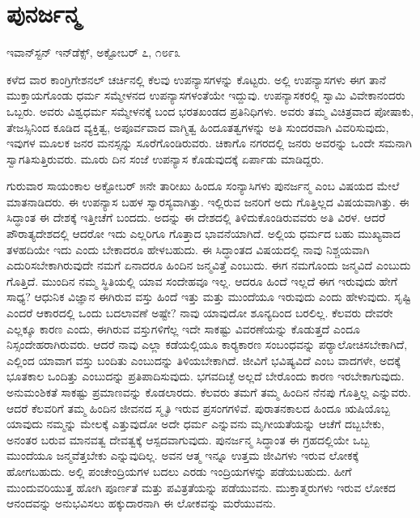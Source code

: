 \section*{ಪುನರ್ಜನ್ಮ }

\begin{flushright}
ಇವಾನ್‍ಸ್ಟನ್ ಇನ್‍ಡೆಕ್ಸ್, ಅಕ್ಟೋಬರ್ ೭, ೧೮೯೩
\end{flushright}

ಕಳೆದ ವಾರ ಕಾಂಗ್ರಿಗೇಶನಲ್ ಚರ್ಚಿನಲ್ಲಿ ಕೆಲವು ಉಪನ್ಯಾಸಗಳನ್ನು ಕೊಟ್ಟರು. ಅಲ್ಲಿ ಉಪನ್ಯಾಸಗಳು ಈಗ ತಾನೆ ಮುಕ್ತಾಯಗೊಂಡು ಧರ್ಮ ಸಮ್ಮೇಳನದ ಉಪನ್ಯಾಸಗಳಂತೆಯೇ ಇದ್ದುವು. ಉಪನ್ಯಾಸಕರಲ್ಲಿ ಸ್ವಾಮಿ ವಿವೇಕಾನಂದರು ಒಬ್ಬರು. ಅವರು ವಿಶ್ವಧರ್ಮ ಸಮ್ಮೇಳನಕ್ಕೆ ಬಂದ ಭರತಖಂಡದ ಪ್ರತಿನಿಧಿಗಳು. ಅವರು ತಮ್ಮ ವಿಚಿತ್ರವಾದ ಪೋಷಾಕು, ತೇಜಸ್ಸಿನಿಂದ ಕೂಡಿದ ವ್ಯಕ್ತಿತ್ವ, ಅಪೂರ್ವವಾದ ವಾಗ್ಮಿತ್ವ ಹಿಂದೂತತ್ವಗಳನ್ನು ಅತಿ ಸುಂದರವಾಗಿ ವಿವರಿಸುವುದು, ಇವುಗಳ ಮೂಲಕ ಜನರ ಮನಸ್ಸನ್ನು ಸೂರೆಗೊಂಡಿರುವರು. ಚಿಕಾಗೊ ನಗರದಲ್ಲಿ ಜನರು ಅವರನ್ನು ಒಂದೇ ಸಮನಾಗಿ ಸ್ವಾಗತಿಸುತ್ತಿರುವರು. ಮೂರು ದಿನ ಸಂಜೆ ಉಪನ್ಯಾಸ ಕೊಡುವುದಕ್ಕೆ ಏರ್ಪಾಡು ಮಾಡಿದ್ದರು. 

 ಗುರುವಾರ ಸಾಯಂಕಾಲ ಅಕ್ಟೋಬರ್ ೫ನೇ ತಾರೀಖು ಹಿಂದೂ ಸಂನ್ಯಾಸಿಗಳು ಪುನರ್ಜನ್ಮ ಎಂಬ ವಿಷಯದ ಮೇಲೆ ಮಾತನಾಡಿದರು. ಈ ಉಪನ್ಯಾಸ ಬಹಳ ಸ್ವಾರಸ್ಯವಾಗಿತ್ತು. ಇಲ್ಲಿರುವ ಜನರಿಗೆ ಅದು ಗೊತ್ತಿಲ್ಲದ ವಿಷಯವಾಗಿತ್ತು. ಈ ಸಿದ್ಧಾಂತ ಈ ದೇಶಕ್ಕೆ ಇತ್ತೀಚೆಗೆ ಬಂದದು. ಅದನ್ನು ಈ ದೇಶದಲ್ಲಿ ತಿಳಿದುಕೊಂಡಿರುವವರು ಅತಿ ವಿರಳ. ಆದರೆ ಪೌರಾತ್ಯದೇಶದಲ್ಲಿ ಆದರೋ ಇದು ಎಲ್ಲರಿಗೂ ಗೊತ್ತಾದ ಭಾವನೆಯಾಗಿದೆ. ಅಲ್ಲಿಯ ಧರ್ಮದ ಬಹು ಮುಖ್ಯವಾದ ತಳಹದಿಯೇ ಇದು ಎಂದು ಬೇಕಾದರೂ ಹೇಳಬಹುದು. ಈ ಸಿದ್ಧಾಂತದ ವಿಷಯದಲ್ಲಿ ನಾವು ನಿಶ್ಚಯವಾಗಿ ಎದುರಿಸಬೇಕಾಗಿರುವುದೇ ನಮಗೆ ಏನಾದರೂ ಹಿಂದಿನ ಜನ್ಮವಿತ್ತೆ ಎಂಬುದು. ಈಗ ನಮಗೊಂದು ಜನ್ಮವಿದೆ ಎಂಬುದು ಗೊತ್ತಿದೆ. ಮುಂದಿನ ನಮ್ಮ ಸ್ಥಿತಿಯಲ್ಲಿ ಯಾವ ಸಂದೇಹವೂ ಇಲ್ಲ. ಆದರೂ ಹಿಂದೆ ಇಲ್ಲದೆ ಈಗ ಇರುವುದು ಹೇಗೆ ಸಾಧ್ಯ? ಆಧುನಿಕ ವಿಜ್ಞಾನ ಈಗಿರುವ ವಸ್ತು ಹಿಂದೆ ಇತ್ತು ಮತ್ತು ಮುಂದೆಯೂ ಇರುವುದು ಎಂದು ಹೇಳುವುದು. ಸೃಷ್ಟಿ ಎಂದರೆ ಆಕಾರದಲ್ಲಿ ಒಂದು ಬದಲಾವಣೆ ಅಷ್ಟೇ? ನಾವು ಯಾವುದೋ ಶೂನ್ಯದಿಂದ ಬರಲಿಲ್ಲ. ಕೆಲವರು ದೇವರೇ ಎಲ್ಲಕ್ಕೂ ಕಾರಣ ಎಂದು, ಈಗಿರುವ ವಸ್ತುಗಳಿಗೆಲ್ಲ ಇದೇ ಸಾಕಷ್ಟು ವಿವರಣೆಯನ್ನು ಕೊಡುತ್ತದೆ ಎಂದೂ ನಿಸ್ಸಂದೇಹರಾಗಿರುವರು. ಆದರೆ ನಾವು ಎಲ್ಲಾ ಕಡೆಯಲ್ಲಿಯೂ ಕಾರ‍್ಯಕಾರಣ ಸಂಬಂಧವನ್ನು ಪರ‍್ಯಾಲೋಚಿಸಬೇಕಾಗಿದೆ, ಎಲ್ಲಿಂದ ಯಾವಾಗ ವಸ್ತು ಬಂದಿತು ಎಂಬುದನ್ನು ತಿಳಿಯಬೇಕಾಗಿದೆ. ಜೀವಿಗೆ ಭವಿಷ್ಯವಿದೆ ಎಂಬ ವಾದಗಳೇ, ಅದಕ್ಕೆ ಭೂತಕಾಲ ಒಂದಿತ್ತು ಎಂಬುದನ್ನು ಪ್ರತಿಪಾದಿಸುವುದು. ಭಗವದಿಚ್ಛೆ ಅಲ್ಲದೆ ಬೇರೊಂದು ಕಾರಣ ಇರಬೇಕಾಗುವುದು. ಅನುಮಂಶಿಕತೆ ಸಾಕಷ್ಟು ಪ್ರಮಾಣವನ್ನು ಕೊಡಲಾರದು. ಕೆಲವರು ತಮಗೆ ತಮ್ಮ ಹಿಂದಿನ ನೆನಪು ಗೊತ್ತಿಲ್ಲ ಎನ್ನುವರು. ಆದರೆ ಕೆಲವರಿಗೆ ತಮ್ಮ ಹಿಂದಿನ ಜೀವನದ ಸ್ಮೃತಿ ಇರುವ ಪ್ರಸಂಗಗಳಿವೆ. ಪುರಾತನಕಾಲದ ಹಿಂದೂ ಋಷಿಯೊಬ್ಬ ಯಾವುದು ನಮ್ಮನ್ನು ಮೇಲಕ್ಕೆ ಎತ್ತುವುದೋ ಅದೇ ಧರ್ಮ ಎನ್ನುವನು ಮೃಗೀಯತೆಯನ್ನು ಆಚೆಗೆ ದಬ್ಬಬೇಕು, ಅನಂತರ ಬರುವ ಮಾನವತ್ವ ದೇವತ್ವಕ್ಕೆ ಆಸ್ಪದವಾಗುವುದು. ಪುನರ್ಜನ್ಮ ಸಿದ್ಧಾಂತ ಈ ಗ್ರಹದಲ್ಲಿಯೇ ಒಬ್ಬ ಮುಂದೆಯೂ ಜನ್ಮವೆತ್ತಬೇಕು ಎನ್ನುವುದಿಲ್ಲ. ಅವನ ಆತ್ಮ ಇನ್ನೂ ಉತ್ತಮ ಜೀವಿಗಳು ಇರುವ ಲೋಕಕ್ಕೆ ಹೋಗಬಹುದು. ಅಲ್ಲಿ ಪಂಚೇಂದ್ರಿಯಗಳ ಬದಲು ಎರಡು ಇಂದ್ರಿಯಗಳನ್ನು ಪಡೆಯಬಹುದು. ಹೀಗೆ ಮುಂದುವರಿಯುತ್ತ ಹೋಗಿ ಪೂರ್ಣತೆ ಮತ್ತು ಪವಿತ್ರತೆಯನ್ನು ಪಡೆಯುವನು. ಮುಕ್ತಾತ್ಮರುಗಳು ಇರುವ ಲೋಕದ ಆನಂದವನ್ನು ಅನುಭವಿಸಲು ಹಕ್ಕುದಾರನಾಗಿ ಈ ಲೋಕವನ್ನು ಮರೆಯುವನು.


